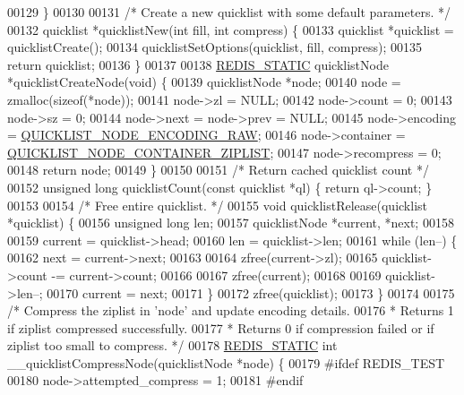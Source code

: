 \begin{DoxyCode}
{00129 \}
00130 
00131 \textcolor{comment}{/* Create a new quicklist with some default parameters. */}
00132 quicklist *quicklistNew(\textcolor{keywordtype}{int} fill, \textcolor{keywordtype}{int} compress) \{
00133     quicklist *quicklist = quicklistCreate();
00134     quicklistSetOptions(quicklist, fill, compress);
00135     \textcolor{keywordflow}{return} quicklist;
00136 \}
00137 
00138 \hyperlink{quicklist_8c_a9c22c9c899458021930a552a4f94d317}{REDIS\_STATIC} quicklistNode *quicklistCreateNode(\textcolor{keywordtype}{void}) \{
00139     quicklistNode *node;
00140     node = zmalloc(\textcolor{keyword}{sizeof}(*node));
00141     node->zl = NULL;
00142     node->count = 0;
00143     node->sz = 0;
00144     node->next = node->prev = NULL;
00145     node->encoding = \hyperlink{quicklist_8h_a064c051a8fda9aa87dc3556b9cafc911}{QUICKLIST\_NODE\_ENCODING\_RAW};
00146     node->container = \hyperlink{quicklist_8h_a4ff5316f03ab8f9afa4228a440f8ddf4}{QUICKLIST\_NODE\_CONTAINER\_ZIPLIST};
00147     node->recompress = 0;
00148     \textcolor{keywordflow}{return} node;
00149 \}
00150 
00151 \textcolor{comment}{/* Return cached quicklist count */}
00152 \textcolor{keywordtype}{unsigned} \textcolor{keywordtype}{long} quicklistCount(\textcolor{keyword}{const} quicklist *ql) \{ \textcolor{keywordflow}{return} ql->count; \}
00153 
00154 \textcolor{comment}{/* Free entire quicklist. */}
00155 \textcolor{keywordtype}{void} quicklistRelease(quicklist *quicklist) \{
00156     \textcolor{keywordtype}{unsigned} \textcolor{keywordtype}{long} len;
00157     quicklistNode *current, *next;
00158 
00159     current = quicklist->head;
00160     len = quicklist->len;
00161     \textcolor{keywordflow}{while} (len--) \{
00162         next = current->next;
00163 
00164         zfree(current->zl);
00165         quicklist->count -= current->count;
00166 
00167         zfree(current);
00168 
00169         quicklist->len--;
00170         current = next;
00171     \}
00172     zfree(quicklist);
00173 \}
00174 
00175 \textcolor{comment}{/* Compress the ziplist in 'node' and update encoding details.}
00176 \textcolor{comment}{ * Returns 1 if ziplist compressed successfully.}
00177 \textcolor{comment}{ * Returns 0 if compression failed or if ziplist too small to compress. */}
00178 \hyperlink{quicklist_8c_a9c22c9c899458021930a552a4f94d317}{REDIS\_STATIC} \textcolor{keywordtype}{int} \_\_quicklistCompressNode(quicklistNode *node) \{
00179 \textcolor{preprocessor}{#}\textcolor{preprocessor}{ifdef} \textcolor{preprocessor}{REDIS\_TEST}
00180     node->attempted\_compress = 1;
00181 \textcolor{preprocessor}{#}\textcolor{preprocessor}{endif}
}
\end{DoxyCode}

